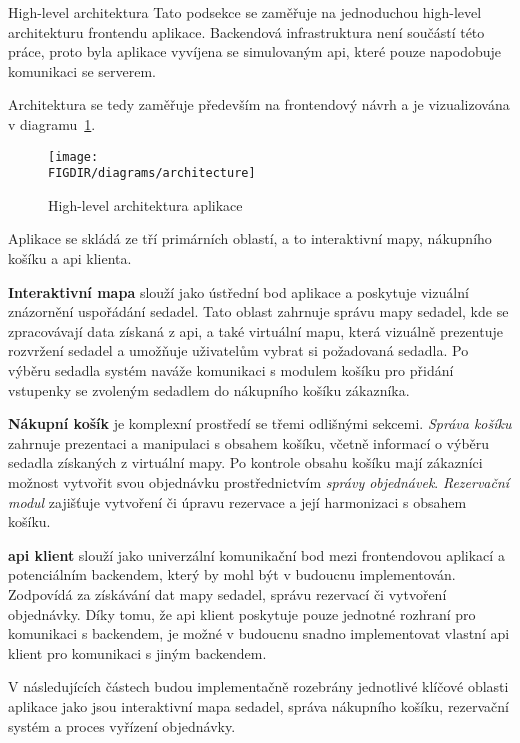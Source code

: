\begin{subsection}{High-level architektura}
    \label{subsec:implementace-architektura-high-level}
    Tato podsekce se zaměřuje na jednoduchou high-level architekturu frontendu aplikace.
    Backendová infrastruktura není součástí této práce, proto byla aplikace vyvíjena se simulovaným \ac{api}, které pouze napodobuje komunikaci se serverem.

    Architektura se tedy zaměřuje především na frontendový návrh a je vizualizována v diagramu~\ref{fig:implementace-architektura-high-level}.

    \begin{figure}[H]
        \centering
        \caption{High-level architektura aplikace}
        \texttt{[image: \\FIGDIR/diagrams/architecture]}
        \source{}
        \label{fig:implementace-architektura-high-level}
    \end{figure}

    Aplikace se skládá ze tří primárních oblastí, a to interaktivní mapy, nákupního košíku a \ac{api} klienta.

    \textbf{Interaktivní mapa} slouží jako ústřední bod aplikace a poskytuje vizuální znázornění uspořádání sedadel.
    Tato oblast zahrnuje správu mapy sedadel, kde se zpracovávají data získaná z \ac{api}, a také virtuální mapu, která vizuálně prezentuje rozvržení sedadel a umožňuje uživatelům vybrat si požadovaná sedadla.
    Po výběru sedadla systém naváže komunikaci s modulem košíku pro přidání vstupenky se zvoleným sedadlem do nákupního košíku zákazníka.

    \textbf{Nákupní košík} je komplexní prostředí se třemi odlišnými sekcemi.
    \textit{Správa košíku} zahrnuje prezentaci a manipulaci s obsahem košíku, včetně informací o výběru sedadla získaných z virtuální mapy.
    Po kontrole obsahu košíku mají zákazníci možnost vytvořit svou objednávku prostřednictvím \textit{správy objednávek}.
    \textit{Rezervační modul} zajišťuje vytvoření či úpravu rezervace a její harmonizaci s obsahem košíku.

    \textbf{\ac{api} klient} slouží jako univerzální komunikační bod mezi frontendovou aplikací a potenciálním backendem, který by mohl být v budoucnu implementován.
    Zodpovídá za získávání dat mapy sedadel, správu rezervací či vytvoření objednávky.
    Díky tomu, že \ac{api} klient poskytuje pouze jednotné rozhraní pro komunikaci s backendem, je možné v budoucnu snadno implementovat vlastní \ac{api} klient pro komunikaci s jiným backendem.

    V následujících částech budou implementačně rozebrány jednotlivé klíčové oblasti aplikace jako jsou interaktivní mapa sedadel, správa nákupního košíku, rezervační systém a proces vyřízení objednávky.
\end{subsection}
